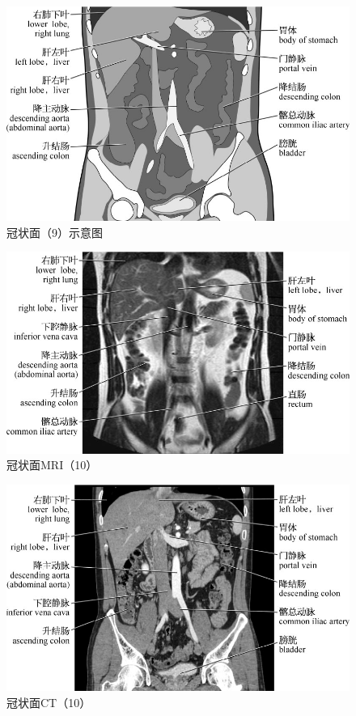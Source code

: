 \begin{figure}[!htbp]
 \centering
 \includegraphics{./images/Image00118.jpg}
 \captionsetup{justification=centering}
 \caption{冠状面（9）示意图}
  \end{figure} 
 \FloatBarrier

\begin{figure}[!htbp]
 \centering
 \includegraphics{./images/Image00119.jpg}
 \captionsetup{justification=centering}
 \caption{冠状面MRI（10）}
  \end{figure} 
 \FloatBarrier

\begin{figure}[!htbp]
 \centering
 \includegraphics{./images/Image00120.jpg}
 \captionsetup{justification=centering}
 \caption{冠状面CT（10）}
  \end{figure} 
 \FloatBarrier

